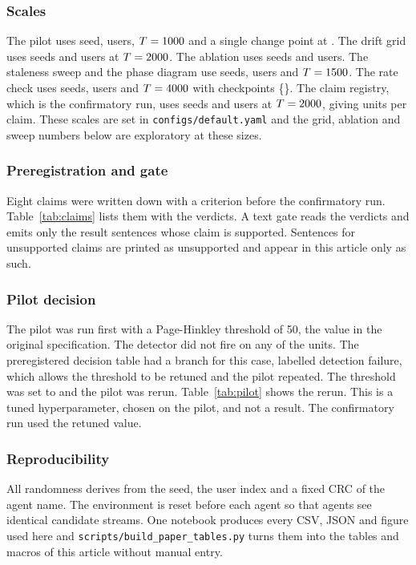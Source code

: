 \subsubsection*{Scales}
The pilot uses \expPilotSeeds{} seed, \expPilotUsers{} users, $T=1000$ and a single change point at \expPilotChangePoint. The drift grid uses \expGridSeeds{} seeds and \expGridUsers{} users at $T=2000$. The ablation uses \expAblationSeeds{} seeds and \expAblationUsers{} users. The staleness sweep and the phase diagram use \expSweepSeeds{} seeds, \expSweepUsers{} users and $T=1500$. The rate check uses \expRateSeeds{} seeds, \expRateUsers{} users and $T=4000$ with checkpoints \{\rateCheckpoints\}. The claim registry, which is the confirmatory run, uses \expClaimsSeeds{} seeds and \expClaimsUsers{} users at $T=2000$, giving \supUnits{} units per claim. These scales are set in \texttt{configs/default.yaml} and the grid, ablation and sweep numbers below are exploratory at these sizes.

\subsubsection*{Preregistration and gate}
Eight claims were written down with a criterion before the confirmatory run. Table~\ref{tab:claims} lists them with the verdicts. A text gate reads the verdicts and emits only the result sentences whose claim is supported. Sentences for unsupported claims are printed as unsupported and appear in this article only as such.

\subsubsection*{Pilot decision}
The pilot was run first with a Page-Hinkley threshold of 50, the value in the original specification. The detector did not fire on any of the \pilotUnits{} units. The preregistered decision table had a branch for this case, labelled detection failure, which allows the threshold to be retuned and the pilot repeated. The threshold was set to \cfgPHThreshold{} and the pilot was rerun. Table~\ref{tab:pilot} shows the rerun. This is a tuned hyperparameter, chosen on the pilot, and not a result. The confirmatory run used the retuned value.

\subsubsection*{Reproducibility}
All randomness derives from the seed, the user index and a fixed CRC of the agent name. The environment is reset before each agent so that agents see identical candidate streams. One notebook produces every CSV, JSON and figure used here and \texttt{scripts/build\_paper\_tables.py} turns them into the tables and macros of this article without manual entry.

